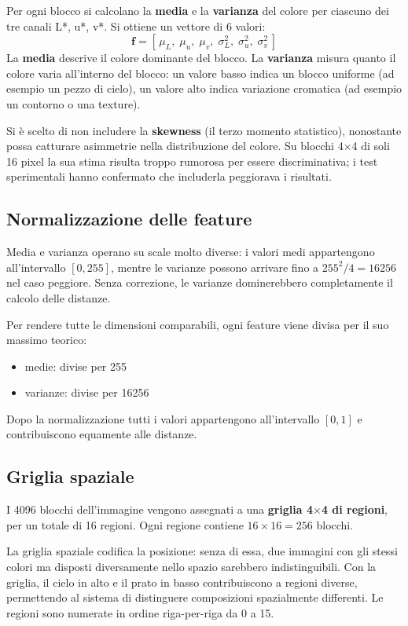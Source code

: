\documentclass[12pt, a4paper]{article}
\begin{document}
Per ogni blocco si calcolano la \textbf{media} e la \textbf{varianza} del colore per
ciascuno dei tre canali L*, u*, v*. Si ottiene un vettore di 6 valori:
\[
\mathbf{f} = [\,\mu_L,\; \mu_u,\; \mu_v,\; \sigma^2_L,\; \sigma^2_u,\; \sigma^2_v\,]
\]
La \textbf{media} descrive il colore dominante del blocco. La \textbf{varianza} misura
quanto il colore varia all'interno del blocco: un valore basso indica un blocco uniforme
(ad esempio un pezzo di cielo), un valore alto indica variazione cromatica (ad esempio
un contorno o una texture).

Si è scelto di non includere la \textbf{skewness} (il terzo momento statistico), nonostante
possa catturare asimmetrie nella distribuzione del colore. Su blocchi 4$\times$4 di soli
16 pixel la sua stima risulta troppo rumorosa per essere discriminativa; i test sperimentali
hanno confermato che includerla peggiorava i risultati.

\subsection{Normalizzazione delle feature}

Media e varianza operano su scale molto diverse: i valori medi appartengono all'intervallo
$[0, 255]$, mentre le varianze possono arrivare fino a $255^2/4 = 16256$ nel caso peggiore.
Senza correzione, le varianze dominerebbero completamente il calcolo delle distanze.

Per rendere tutte le dimensioni comparabili, ogni feature viene divisa per il suo massimo
teorico:
\begin{itemize}
    \item medie: divise per 255
    \item varianze: divise per 16256
\end{itemize}
Dopo la normalizzazione tutti i valori appartengono all'intervallo $[0, 1]$ e contribuiscono
equamente alle distanze.

\subsection{Griglia spaziale}

I 4096 blocchi dell'immagine vengono assegnati a una \textbf{griglia 4$\times$4 di regioni},
per un totale di 16 regioni. Ogni regione contiene $16 \times 16 = 256$ blocchi.

La griglia spaziale codifica la posizione: senza di essa, due immagini con gli stessi colori
ma disposti diversamente nello spazio sarebbero indistinguibili. Con la griglia, il cielo in
alto e il prato in basso contribuiscono a regioni diverse, permettendo al sistema di
distinguere composizioni spazialmente differenti. Le regioni sono numerate in ordine
riga-per-riga da 0 a 15.
\end{document}
